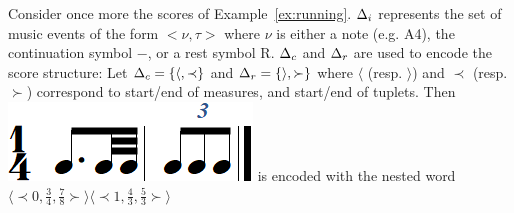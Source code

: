 \begin{example}\label{ex:nested-word}
Consider once more the scores of Example~\ref{ex:running}.
$\Deltai$ represents the set of music events of the form $<\nu, \tau>$
where $\nu$ is either a note (e.g. A4), the continuation symbol $-$, or a
rest symbol R. $\Deltac$ and  $\Deltar$ are used to encode the score structure:
Let $\Deltac = \{\langle, \prec\}$ and  $\Deltar = \{\rangle, \succ\}$ where $\langle$
(resp. $\rangle$)
and $\prec$ (resp. $\succ$) correspond to start/end of measures, and start/end of
tuplets. Then  \includegraphics[scale=0.20]{pictures/score5.png}
is encoded with the nested word $\langle \prec 0, \frac{3}{4}, \frac{7}{8} \succ \rangle \langle \prec 1, \frac{4}{3}, \frac{5}{3}  \succ \rangle$
\endex
\end{example}


